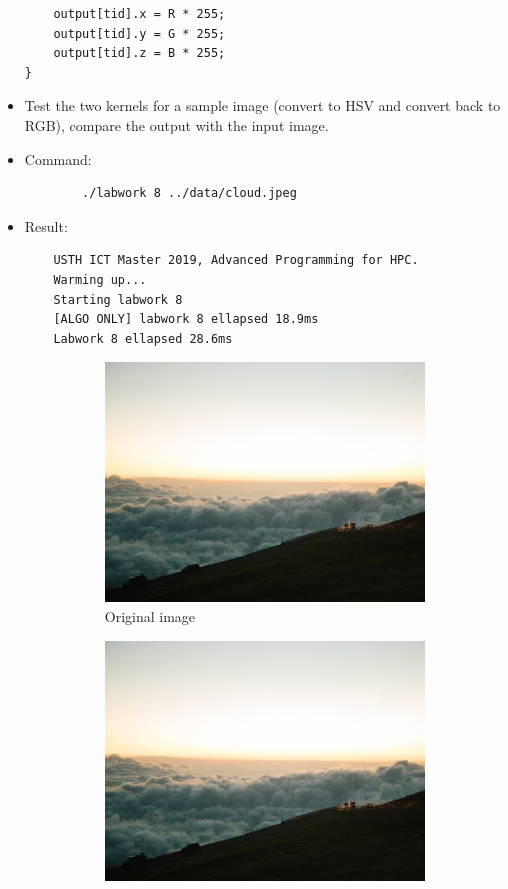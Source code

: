 \documentclass{article}
\begin{document}
\begin{itemize}
\begin{verbatim}
    output[tid].x = R * 255;
    output[tid].y = G * 255;
    output[tid].z = B * 255;
}
    \end{verbatim}
    \item Test the two kernels for a sample image (convert to HSV and convert back to RGB), compare the output with the input image.
    \item Command:
    \begin{verbatim}
        ./labwork 8 ../data/cloud.jpeg 
    \end{verbatim}
    \item Result:
    \begin{verbatim}
    USTH ICT Master 2019, Advanced Programming for HPC.
    Warming up...
    Starting labwork 8
    [ALGO ONLY] labwork 8 ellapsed 18.9ms
    Labwork 8 ellapsed 28.6ms
    \end{verbatim}
    \begin{figure}[h]
      \centering
      \begin{subfigure}{.45\textwidth}
        \includegraphics[width=\linewidth]{./result/cloud.jpeg}
        \caption{Original image}
      \end{subfigure}
      \hspace{1cm}
      \begin{subfigure}{.45\textwidth}
        \includegraphics[width=\linewidth]{./result/labwork8-gpu-out.jpg}

\end{subfigure}
\end{figure}
\end{itemize}
\end{document}
